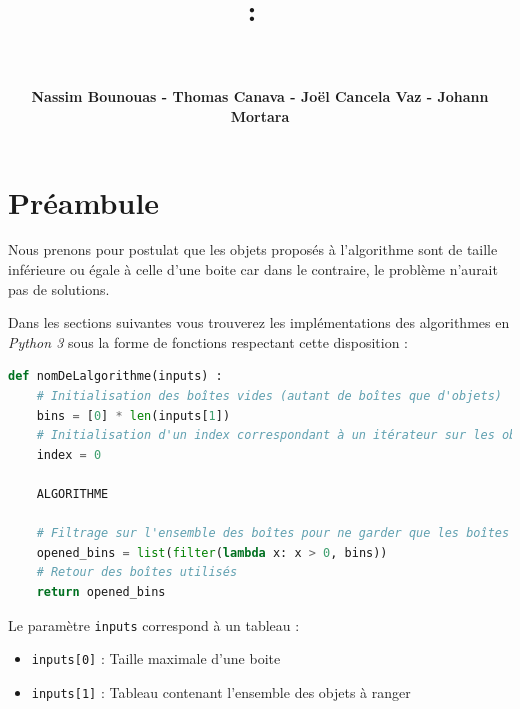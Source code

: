 \documentclass{article}
\title{
\vspace{2in}
\textmd{\textbf{\hmwkClass :\ \hmwkTitle}}\\
\vspace{0.2in}\Large{\textit{\ \hmwkDueDate}}
\vspace{3in}
}
\author{\textbf{Nassim Bounouas - Thomas Canava - Joël Cancela Vaz - Johann Mortara}}
\date{} %
\begin{document}
\maketitle



\newpage
{}
\tableofcontents
\newpage

\section{Préambule}
Nous prenons pour postulat que les objets proposés à l'algorithme sont de taille inférieure ou égale à celle d'une boite car dans le contraire, le problème n'aurait pas
de solutions.

Dans les sections suivantes vous trouverez les implémentations des algorithmes en \textit{Python 3} sous la forme de fonctions respectant cette disposition :

\begin{lstlisting}[language=Python, frame=single]
def nomDeLalgorithme(inputs) :
    # Initialisation des boîtes vides (autant de boîtes que d'objets)
    bins = [0] * len(inputs[1])
    # Initialisation d'un index correspondant à un itérateur sur les objets
    index = 0

    ALGORITHME

    # Filtrage sur l'ensemble des boîtes pour ne garder que les boîtes utilisées
    opened_bins = list(filter(lambda x: x > 0, bins))
    # Retour des boîtes utilisés
    return opened_bins
\end{lstlisting}

Le paramètre \texttt{inputs} correspond à un tableau :
    \begin{itemize}
        \item \texttt{inputs[0]} :  Taille maximale d'une boite
        \item \texttt{inputs[1]} :  Tableau contenant l'ensemble des objets à ranger
    \end{itemize}

\end{document}
